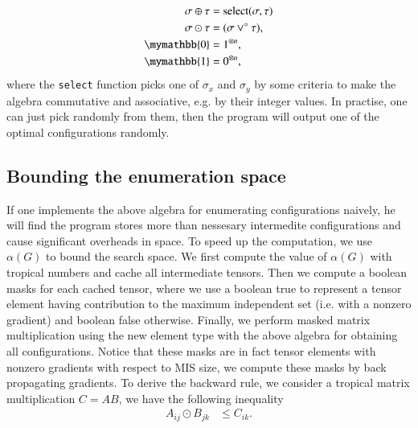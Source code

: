 \documentclass[review,onefignum,onetabnum]{siamart190516}
\newcommand{\<}{\langle}
\renewcommand{\>}{\rangle}
\begin{document}

\begin{align}
\begin{split}
    \sigma \oplus \tau &= {\rm select}(\sigma, \tau)\\
    \sigma \odot \tau &= (\sigma\lor^\circ \tau),\\
    \mymathbb{0} &= 1^{\otimes n},\\
    \mymathbb{1} &= 0^{\otimes n},
\end{split}\label{eq:singleconfig}
\end{align}
where the \texttt{select} function picks one of $\sigma_x$ and $\sigma_y$ by some criteria to make the algebra commutative and associative, e.g. by their integer values.
In practise, one can just pick randomly from them, then the program will output one of the optimal configurations randomly.

\subsection{Bounding the enumeration space}
If one implements the above algebra for enumerating configurations naively, he will find the program stores more than nessesary intermedite configurations and cause significant overheads in space.
To speed up the computation, we use $\alpha(G)$ to bound the search space.
We first compute the value of $\alpha(G)$ with tropical numbers and cache all intermediate tensors.
Then we compute a boolean masks for each cached tensor, where we use a boolean true to represent a tensor element having contribution to the maximum independent set (i.e. with a nonzero gradient) and boolean false otherwise.
Finally, we perform masked matrix multiplication using the new element type with the above algebra for obtaining all configurations.
Notice that these masks are in fact tensor elements with nonzero gradients with respect to MIS size, we compute these masks by back propagating gradients.
To derive the backward rule, we consider a tropical matrix multiplication $C = A B$, we have the following inequality
\begin{align}
    A_{ij} \odot B_{jk} &\leq C_{ik}.
\end{align}
\end{document}
